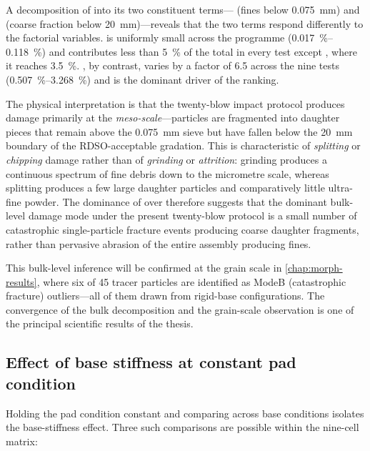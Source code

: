A decomposition of \FIIN{} into its two constituent terms---\PoneM{}
(fines below \SI{0.075}{\milli\metre}) and \PtwoM{} (coarse fraction
below \SI{20}{\milli\metre})---reveals that the two terms respond
differently to the factorial variables. \PoneM{} is uniformly small
across the programme (\SIrange{0.017}{0.118}{\percent}) and contributes
less than \SI{5}{\percent} of the total \FIIN{} in every test except
, where it reaches \SI{3.5}{\percent}. \PtwoM{}, by
contrast, varies by a factor of 6.5 across the nine tests
(\SIrange{0.507}{3.268}{\percent}) and is the dominant driver of the
\FIIN{} ranking.

The physical interpretation is that the twenty-blow impact protocol
produces damage primarily at the \emph{meso-scale}---particles are
fragmented into daughter pieces that remain above the
\SI{0.075}{\milli\metre} sieve but have fallen below the
\SI{20}{\milli\metre} boundary of the \gls{RDSO}-acceptable gradation.
This is characteristic of \emph{splitting} or \emph{chipping} damage
rather than of \emph{grinding} or \emph{attrition}: grinding produces a
continuous spectrum of fine debris down to the micrometre scale,
whereas splitting produces a few large daughter particles and comparatively
little ultra-fine powder. The dominance of \PtwoM{} over \PoneM{}
therefore suggests that the dominant bulk-level damage mode under the
present twenty-blow protocol is a small number of catastrophic
single-particle fracture events producing coarse daughter fragments,
rather than pervasive abrasion of the entire assembly producing fines.

This bulk-level inference will be confirmed at the grain scale in
\cref{chap:morph-results}, where six of 45 tracer particles are
identified as \gls{ModeB} (catastrophic fracture) outliers---all of them
drawn from rigid-base configurations. The convergence of the bulk
decomposition and the grain-scale observation is one of the principal
scientific results of the thesis.

\subsection{Effect of base stiffness at constant pad condition}
\label{sec:imp-base-effect}

Holding the pad condition constant and comparing across base conditions
isolates the base-stiffness effect. Three such comparisons are possible
within the nine-cell matrix:

